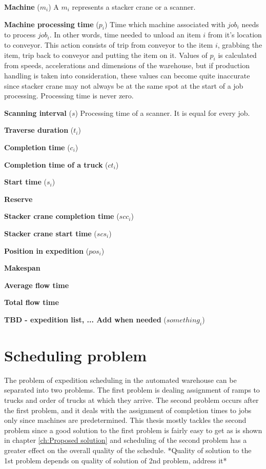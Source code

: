 \documentclass{ctuthesis}
\begin{document}
\noindent \textbf{Machine} ($m_i$) A $m_i$ represents a stacker crane or a scanner. 

\noindent \textbf{Machine processing time} ($p_i$) Time which machine associated with $job_i$ needs to process $job_i$. In other words, time needed to unload an item $i$ from it's location to conveyor. This action consists of trip from conveyor to the item $i$, grabbing the item, trip back to conveyor and putting the item on it. Values of $p_i$ is calculated from speeds, accelerations and dimensions of the warehouse, but if production handling is taken into consideration, these values can become quite inaccurate since stacker crane may not always be at the same spot at the start of a job processing. Processing time is never zero.


\noindent \textbf{Scanning interval} ($s$) Processing time of a scanner. It is equal for every job.

\noindent \textbf{Traverse duration} ($t_i$)

\noindent \textbf{Completion time} ($c_i$)

\noindent \textbf{Completion time of a truck} ($ct_i$)

\noindent \textbf{Start time} ($s_i$)

\noindent \textbf{Reserve}

\noindent \textbf{Stacker crane completion time} ($scc_i$)

\noindent \textbf{Stacker crane start time} ($scs_i$)

\noindent \textbf{Position in expedition} ($pos_i$)

\noindent \textbf{Makespan}

\noindent \textbf{Average flow time}

\noindent \textbf{Total flow time}

\noindent \textbf{TBD - expedition list, ... Add when needed} ($something_i$)


\section{Scheduling problem}
 
 The problem of expedition scheduling in the automated warehouse can be separated into two problems. The first problem is dealing assignment of ramps to trucks and order of trucks at which they arrive. The second problem occurs after the first problem, and it deals with the assignment of completion times to jobs only since machines are predetermined. This thesis mostly tackles the second problem since a good solution to the first problem is fairly easy to get as is shown in chapter \ref{ch:Proposed solution} and scheduling of the second problem has a greater effect on the overall quality of the schedule. *Quality of solution to the 1st problem depends on quality of solution of 2nd problem, address it* 
 
\end{document}
